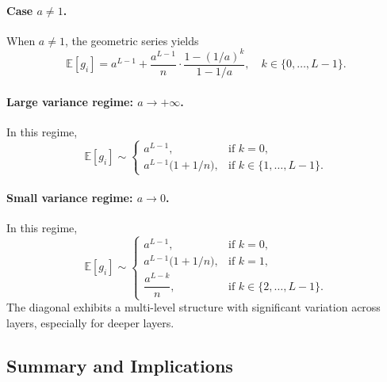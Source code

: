 \documentclass{article}
\theoremstyle{plain}
\theoremstyle{definition}
\theoremstyle{remark}
\begin{document}
\paragraph{Case $a \neq 1$.}
When $a \neq 1$, the geometric series yields
\begin{equation}
\label{eq:expected-aneq1}
\mathbb{E}[g_i] = a^{L-1} + \frac{a^{L-1}}{n} \cdot \frac{1-(1/a)^{k}}{1-1/a}, \quad k \in \{0, \ldots, L-1\}.
\end{equation}


\paragraph{Large variance regime: $a \to +\infty$.}
In this regime,
\begin{equation}
\label{eq:expected-large-a}
\mathbb{E}[g_i] \sim 
\begin{cases}
a^{L-1}, & \text{if } k = 0,\\[6pt]
a^{L-1}\big(1+1/n\big), & \text{if } k \in \{1, \ldots, L-1\}.
\end{cases}
\end{equation}
\paragraph{Small variance regime: $a \to 0$.}
In this regime,
\begin{equation}
\label{eq:expected-small-a}
\mathbb{E}[g_i] \sim 
\begin{cases}
a^{L-1}, & \text{if } k = 0,\\[6pt]
a^{L-1}\big(1 + 1/n\big), & \text{if } k = 1,\\[6pt]
\dfrac{a^{L-k}}{n}, & \text{if } k \in \{2, \ldots, L-1\}.
\end{cases}
\end{equation}
The diagonal exhibits a multi-level structure with significant variation across layers, especially for deeper layers.



\subsection{Summary and Implications}
\end{document}
